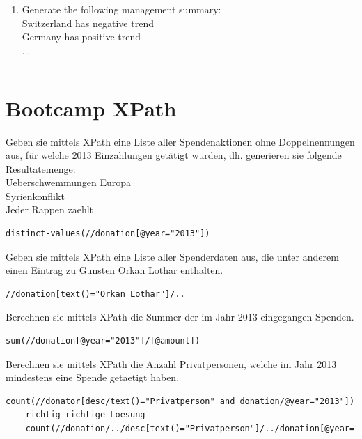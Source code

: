 \begin{enumerate}
\item Generate the following management summary:\\
Switzerland has negative trend\\
Germany has positive trend\\...
\begin{lstlisting}[language=XML]
\end{lstlisting}
\end{enumerate}

\section {Bootcamp XPath}
Geben sie mittels XPath eine Liste aller Spendenaktionen ohne Doppelnennungen aus, für welche 2013 Einzahlungen getätigt wurden, dh. generieren sie folgende Resultatemenge:\\
Ueberschwemmungen Europa\\
Syrienkonflikt\\
Jeder Rappen zaehlt\\
\begin{lstlisting}[language=XML]
	distinct-values(//donation[@year="2013"])
\end{lstlisting}
Geben sie mittels XPath eine Liste aller Spenderdaten aus, die unter anderem einen Eintrag zu Gunsten Orkan Lothar enthalten.
\begin{lstlisting}[language=XML]
	//donation[text()="Orkan Lothar"]/..
\end{lstlisting}
Berechnen sie mittels XPath die Summer der im Jahr 2013 eingegangen Spenden.
\begin{lstlisting}[language=XML]
	sum(//donation[@year="2013"]/[@amount])
\end{lstlisting}
Berechnen sie mittels XPath die Anzahl Privatpersonen, welche im Jahr 2013 mindestens eine Spende getaetigt haben.
\begin{lstlisting}[language=XML]
	count(//donator[desc/text()="Privatperson" and donation/@year="2013"])
	richtig richtige Loesung
	count(//donation/../desc[text()="Privatperson"]/../donation[@year="2013"][1])
\end{lstlisting}
